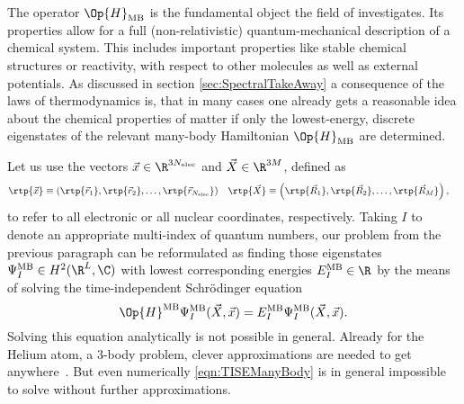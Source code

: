 The operator $\Op{H}_\text{MB}$ is the fundamental object
the field of  investigates.
Its properties allow for a full
(non-relativistic) quantum-mechanical description
of a chemical system.
This includes important properties like stable chemical structures
or reactivity, with respect to other molecules as well as external potentials.
As discussed in section \vref{sec:SpectralTakeAway}
a consequence of the laws of thermodynamics is,
that in many cases one already gets
a reasonable idea about the chemical properties of matter
if only the lowest-energy, discrete eigenstates of the relevant
many-body Hamiltonian $\Op{H}_\text{MB}$ are determined.

Let us use the vectors $\vec{x} \in \R^{3\Nelec}$ and $\vec{X} \in \R^{3M}$, defined as
\begin{align}
	\rtp{\vec{x}} &\equiv \left(\rtp{\vec{r}_1}, \rtp{\vec{r}_2}, \ldots, \rtp{\vec{r}_{\Nelec}}\right)
	&
	\rtp{\vec{X}} &\equiv \left(\rtp{\vec{R}_1}, \rtp{\vec{R}_2}, \ldots, \rtp{\vec{R}_{M}}\right),
	\label{eqn:DefAllCoords}
\end{align}
to refer to all electronic or all nuclear coordinates, respectively.
Taking $I$ to denote an appropriate multi-index of quantum numbers,
our problem from the previous paragraph can be reformulated
as finding those eigenstates $\Psi^\text{MB}_I \in H^2(\R^L, \C)$
with lowest corresponding energies $E^\text{MB}_I \in \R$
by the means of solving the time-independent Schrödinger equation
\begin{equation}
	\Op{H}^\text{MB} \Psi_I^\text{MB}(\vec{X}, \vec{x})
	= E_I^\text{MB} \Psi_I^\text{MB}(\vec{X}, \vec{x}).
	\label{eqn:TISEManyBody}
\end{equation}
Solving this equation analytically is not possible in general.
Already for the Helium atom, a 3-body problem, clever approximations are needed
to get anywhere~\cite{Hylleras1929}.
But even numerically \eqref{eqn:TISEManyBody} is in general impossible to solve
without further approximations.

